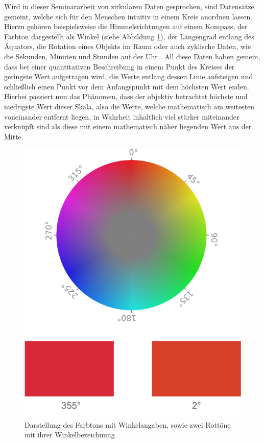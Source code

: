 \documentclass[
12pt, %
toc=listofnumbered, %
toc=chapterentrydotfill, %
numbers=noenddot, %
captions=tableheading, %
bibliography=numbered
]{scrreprt}
\begin{document}
Wird in dieser Seminararbeit von zirkulären Daten gesprochen, sind Datensätze gemeint, welche sich für den Menschen intuitiv in einem Kreis anordnen lassen. 
Hierzu gehören beispielsweise die Himmelsrichtungen auf einem Kompass, der Farbton dargestellt als Winkel (siehe Abbildung \ref{fig:colorcircle}), der Längengrad entlang des Äquators, die Rotation eines Objekts im Raum oder auch zyklische Daten, wie die Sekunden, Minuten und Stunden auf der Uhr \cite{2016_London_EncodingCyclicalContinuous}. 
All diese Daten haben gemein, dass bei einer quantitativen Beschreibung in einem Punkt des Kreises der geringste Wert aufgetragen wird, die Werte entlang dessen Linie aufsteigen und schließlich einen Punkt vor dem Anfangspunkt mit dem höchsten Wert enden. 
Hierbei passiert nun das Phänomen, dass der objektiv betrachtet höchste und niedrigste Wert dieser Skala, also die Werte, welche mathematisch am weitesten voneinander entfernt liegen, in Wahrheit inhaltlich viel stärker miteinander verknüpft sind als diese mit 
einem mathematisch näher liegenden Wert aus der Mitte. 

\begin{figure}[tph]
	\begin{center}
		\includegraphics[width=0.5\linewidth]{./images/colorcircle.png}
		\caption{Darstellung des Farbtons mit Winkelangaben, sowie zwei Rottöne mit ihrer Winkelbezeichnung \cite{__Farbraum}}
		\label{fig:colorcircle}
	\end{center}
\end{figure}
\end{document}
